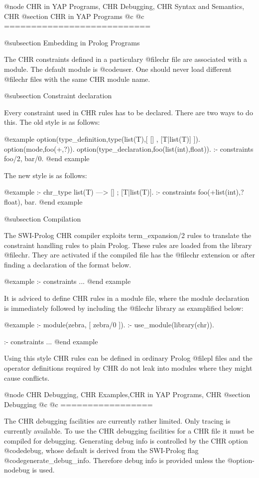{@node CHR in YAP Programs, CHR Debugging, CHR Syntax and Semantics, CHR
@section CHR in YAP Programs	
@c	\label{sec:practical}
@c ===========================


@subsection Embedding in Prolog Programs

The CHR constraints defined in a particulary @file{chr} file are
associated with a module. The default module is @code{user}. One should
never load different @file{chr} files with the same CHR module name.

@subsection Constraint declaration

Every constraint used in CHR rules has to be declared.
There are two ways to do this. The old style is as follows:

@example
option(type_definition,type(list(T),[ [] , [T|list(T)] ]).
option(mode,foo(+,?)).
option(type_declaration,foo(list(int),float)).
:- constraints foo/2, bar/0.
@end example

The new style is as follows:

@example
:- chr_type list(T) ---> [] ; [T|list(T)].
:- constraints foo(+list(int),?float), bar.
@end example


@subsection Compilation

The SWI-Prolog CHR compiler exploits term_expansion/2 rules to translate
the constraint handling rules to plain Prolog. These rules are loaded
from the library @file{chr}.   They are activated if the compiled file
has the @file{chr} extension or after finding a declaration of the
format below.

@example
:- constraints ...
@end example

It is adviced to define CHR rules in a module file, where the module
declaration is immediately followed by including the @file{chr}
library as examplified below:

@example
:- module(zebra, [ zebra/0 ]).
:- use_module(library(chr)).

:- constraints ...
@end example

Using this style CHR rules can be defined in ordinary Prolog
@file{pl} files and the operator definitions required by CHR do not
leak into modules where they might cause conflicts.


@node CHR Debugging, CHR Examples,CHR in YAP Programs, CHR
@section Debugging
@c			\label{sec:debugging}
@c =================

The CHR debugging facilities are currently rather limited. Only tracing
is currently available. To use the CHR debugging facilities for a CHR
file it must be compiled for debugging. Generating debug info is
controlled by the CHR option @code{debug}, whose default is derived
from the SWI-Prolog flag @code{generate_debug_info}.  Therefore debug
info is provided unless the @option{-nodebug} is used.


}
